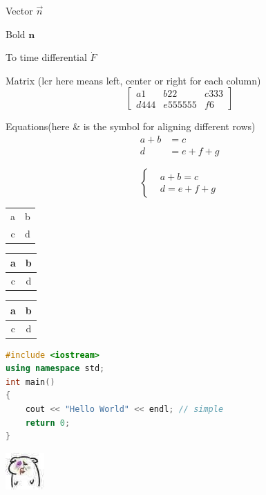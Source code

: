 \documentclass{article}
\begin{document}
Vector $\vec{n}$

Bold $\mathbf{n}$

To time differential $\dot{F}$

Matrix (lcr here means left, center or right for each column)
\[
\left[
\begin{array}{lcr}
a1 & b22 & c333 \\
d444 & e555555 & f6
\end{array}
\right]
\]

Equations(here \& is the symbol for aligning different rows)
\begin{align}
a+b&=c\\
d&=e+f+g
\end{align}

\[
\left\{
\begin{aligned}
&a+b=c\\
&d=e+f+g
\end{aligned}
\right.
\]

\begin{tabular}{|c|c|}
a & b \\
c & d\\
\end{tabular}

\begin{tabular}{|c|c|}
\hline
a & b \\
\hline
c & d\\
\hline
\end{tabular}

\begin{center}
\begin{tabular}{|c|c|}
\hline
a & b \\ \hline
c & d\\
\hline
\end{tabular}
\end{center}

\begin{lstlisting}[language={C++}]
#include <iostream>
using namespace std;
int main()
{
	cout << "Hello World" << endl; // simple
	return 0;
}
\end{lstlisting}

\includegraphics{1.jpg}
\end{document}
